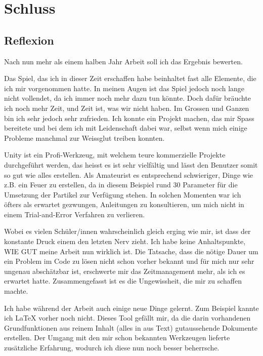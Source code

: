 \chapter{Schluss}

\section{Reflexion }

Nach nun mehr als einem halben Jahr Arbeit soll ich das Ergebnis bewerten.

\smallskip
Das Spiel, das ich in dieser Zeit erschaffen habe beinhaltet fast alle Elemente, die ich mir vorgenommen hatte.
In meinen Augen ist das Spiel jedoch noch lange nicht \glqq vollendet\grqq, da ich immer noch mehr dazu tun könnte.
Doch dafür bräuchte ich noch mehr Zeit, und Zeit ist, was wir nicht haben.
Im Grossen und Ganzen bin ich sehr jedoch sehr zufrieden. Ich konnte ein Projekt machen, das mir Spass bereitete und bei dem ich mit Leidenschaft dabei war, selbst wenn mich einige Probleme manchmal zur Weissglut treiben konnten. 

\smallskip
Unity ist ein Profi-Werkzeug, mit welchem teure kommerzielle Projekte durchgeführt werden, das heisst es ist sehr vielfältig und lässt den Benutzer somit so gut wie alles erstellen.
Als \glqq Amateur\grqq ist es entsprechend schwieriger, Dinge wie z.B. ein Feuer zu erstellen, da in diesem Beispiel rund 30 Parameter für die Umsetzung der Partikel zur Verfügung stehen.
In solchen Momenten war ich öfters als erwartet gezwungen, Anleitungen zu konsultieren, um mich nicht in einem Trial-and-Error Verfahren zu verlieren.

\smallskip
Wobei es vielen Schüler/innen wahrscheinlich gleich erging wie mir, ist dass der konstante Druck einem den letzten Nerv zieht. Ich habe keine Anhaltspunkte, WIE GUT meine Arbeit nun wirklich ist.
Die Tatsache, dass die nötige Dauer um ein Problem im Code zu lösen nicht schon vorher bekannt  und für mich nur sehr ungenau abschätzbar ist, erschwerte mir das Zeitmanagement mehr, als ich es erwartet hatte.
Zusammengefasst ist es die Ungewissheit, die mir zu schaffen machte.

\smallskip
Ich habe während der Arbeit auch einige neue Dinge gelernt.
Zum Beispiel kannte ich LaTeX vorher noch nicht.
Dieses Tool gefällt mir, da die darin vorhandenen Grundfunktionen aus reinem Inhalt (alles in aus Text) gutaussehende Dokumente erstellen.
Der Umgang mit den mir schon bekannten Werkzeugen lieferte zusätzliche Erfahrung, wodurch ich diese nun noch besser beherrsche.

